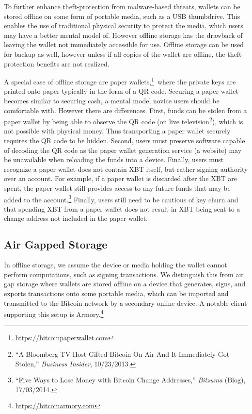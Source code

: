 To further enhance theft-protection from malware-based threats, wallets can be stored offline on some form of portable media, such as a USB thumbdrive. This enables the use of traditional physical security to protect the media, which users may have a better mental model of. However offline storage has the drawback of leaving the wallet not immediately accessible for use. Offline storage can be used for backup as well, however unless if all copies of the wallet are offline, the theft-protection benefits are not realized. 

A special case of offline storage are paper wallets,\footnote{\url {https://bitcoinpaperwallet.com}}\ where the private keys are printed onto paper typically in the form of a QR code. Securing a paper wallet becomes similar to securing cash, a mental model novice users should be comfortable with. However there are differences. First, funds can be stolen from a paper wallet by being able to observe the QR code (\eg on live television\footnote{``A Bloomberg TV Host Gifted Bitcoin On Air And It Immediately Got Stolen,'' \textit{Business Insider}, 10/23/2013.}), which is not possible with physical money. Thus transporting a paper wallet securely requires the QR code to be hidden. Second, users must preserve software capable of decoding the QR code as the paper wallet generation service (\eg a website) may be unavailable when reloading the funds into a device. Finally, users must recognize a paper wallet does not contain XBT itself, but rather signing authority over an account. For example, if a paper wallet is discarded after the XBT are spent, the paper wallet still provides access to any future funds that may be added to the account.\footnote{``Five Ways to Lose Money with Bitcoin Change Addresses,'' \textit{Bitzuma} (Blog), 17/03/2014.} Finally, users still need to be cautious of key churn and that spending XBT from a paper wallet does not result in XBT being sent to a change address not included in the paper wallet. 

\subsection{Air Gapped Storage}

In offline storage, we assume the device or media holding the wallet cannot perform computations, such as signing transactions. We distinguish this from air gap storage where wallets are stored offline on a device that generates, signs, and exports transactions onto some portable media, which can be imported and transmitted to the Bitcoin network by a secondary online device. A notable client supporting this setup is Armory.\footnote{\url{https://bitcoinarmory.com}} 

